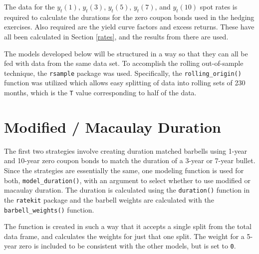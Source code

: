 \documentclass[openany]{book}
\theoremstyle{definition}
\theoremstyle{definition}
\theoremstyle{definition}
\theoremstyle{remark}
\begin{document}
\small

\normalsize

The data for the \(y_t(1)\), \(y_t(3)\), \(y_t(5)\), \(y_t(7)\), and
\(y_t(10)\) spot rates is required to calculate the durations for the
zero coupon bonds used in the hedging exercises. Also required are the
yield curve factors and excess returns. These have all been calculated
in Section \ref{rates}, and the results from there are used.

\small

\normalsize

The models developed below will be structured in a way so that they can
all be fed with data from the same data set. To accomplish the rolling
out-of-sample technique, the \texttt{rsample} package was used.
Specifically, the \texttt{rolling\_origin()} function was utilized which
allows easy splitting of data into rolling sets of 230 months, which is
the \texttt{T} value corresponding to half of the data.

\small

\normalsize

\small

\normalsize

\small

\normalsize

\small

\normalsize

\hypertarget{modified-macaulay-duration}{%
\section{Modified / Macaulay
Duration}\label{modified-macaulay-duration}}

The first two strategies involve creating duration matched barbells
using 1-year and 10-year zero coupon bonds to match the duration of a
3-year or 7-year bullet. Since the strategies are essentially the same,
one modeling function is used for both, \texttt{model\_duration()}, with
an argument to select whether to use modified or macaulay duration. The
duration is calculated using the \texttt{duration()} function in the
\texttt{ratekit} package and the barbell weights are calculated with the
\texttt{barbell\_weights()} function.

The function is created in such a way that it accepts a single split
from the total data frame, and calculates the weights for just that one
split. The weight for a 5-year zero is included to be consistent with
the other models, but is set to \texttt{0}.
\end{document}
